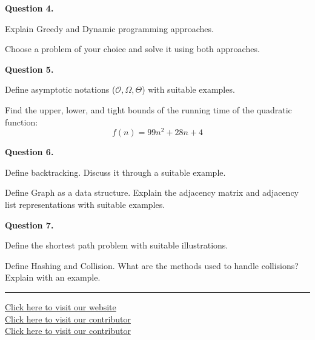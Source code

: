 \documentclass[11pt,a4paper]{article}
\begin{document}
\noindent   \textbf{Question 4.}

\begin{parts}
  \item Explain Greedy and Dynamic programming approaches.
  \item Choose a problem of your choice and solve it using both approaches.
\end{parts}

\medskip


\noindent   \textbf{Question 5.}

\begin{parts}
  \item Define asymptotic notations ($\mathcal{O}, \Omega, \Theta$) with suitable examples.
  \item Find the upper, lower, and tight bounds of the running time of the quadratic function:
  \[ f(n) = 99n^2 + 28n + 4 \]
\end{parts}

\medskip


\noindent   \textbf{Question 6.}

\begin{parts}
  \item Define backtracking. Discuss it through a suitable example.
  \item Define Graph as a data structure. Explain the adjacency matrix and adjacency list representations with suitable examples.
\end{parts}

\medskip


\noindent   \textbf{Question 7.}

\begin{parts}
  \item Define the shortest path problem with suitable illustrations.
  \item Define Hashing and Collision. What are the methods used to handle collisions? Explain with an example.
\end{parts}

\vfill
\rule{\linewidth}{0.4pt}

\begin{center}\small
\href{https://bhu-exam.vercel.app/}{Click here to visit our website}\\[4pt]\href{https://me-aryan.vercel.app/}{Click here to visit our contributor}\\[4pt]\href{https://quashan-me.vercel.app/}{Click here to visit our contributor}
\end{center}
\end{document}
